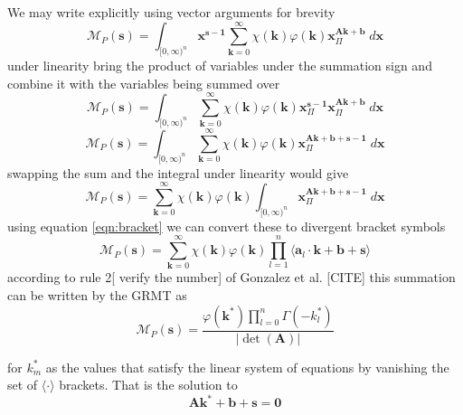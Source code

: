 \documentclass{article}
\begin{document}
We may write explicitly using vector arguments for brevity
\begin{equation}
\mathcal{M}_P(\mathbf{s}) = \int_{[0,\infty)^{n}} \mathbf{x}^{\mathbf{s-1}} \sum_{\mathbf{k}=0}^\infty  \chi(\mathbf{k})\varphi(\mathbf{k}) \mathbf{x}^{\mathbf{A}\mathbf{k}+\mathbf{b}}_\Pi \; d \mathbf{x}
\end{equation}
under linearity bring the product of variables under the summation sign and combine it with the variables being summed over
\begin{equation}
\mathcal{M}_P(\mathbf{s}) = \int_{[0,\infty)^{n}} \sum_{\mathbf{k}=0}^\infty  \chi(\mathbf{k})\varphi(\mathbf{k}) \mathbf{x}^{\mathbf{s-1}}_\Pi \mathbf{x}^{\mathbf{A}\mathbf{k}+\mathbf{b}}_\Pi \; d \mathbf{x}
\end{equation}
\begin{equation}
\mathcal{M}_P(\mathbf{s}) = \int_{[0,\infty)^{n}} \sum_{\mathbf{k}=0}^\infty  \chi(\mathbf{k})\varphi(\mathbf{k})\mathbf{x}^{\mathbf{A}\mathbf{k}+\mathbf{b}+\mathbf{s-1}}_\Pi \; d \mathbf{x}
\end{equation}
swapping the sum and the integral under linearity would give
\begin{equation}
\mathcal{M}_P(\mathbf{s}) = \sum_{\mathbf{k}=0}^\infty  \chi(\mathbf{k})\varphi(\mathbf{k})\int_{[0,\infty)^{n}} \mathbf{x}^{\mathbf{A}\mathbf{k}+\mathbf{b}+\mathbf{s-1}}_\Pi \; d \mathbf{x}
\end{equation}
using equation \ref{eqn:bracket} we can convert these to divergent bracket symbols
\begin{equation}
\mathcal{M}_P(\mathbf{s}) = \sum_{\mathbf{k}=0}^\infty  \chi(\mathbf{k})\varphi(\mathbf{k}) \prod_{l=1}^n \langle \mathbf{a}_l \cdot \mathbf{k} + \mathbf{b} + \mathbf{s} \rangle
\end{equation}
according to rule 2[{\color{red} verify the number}] of Gonzalez et al. [CITE] this summation can be written by the GRMT as 
\begin{equation}
\mathcal{M}_P(\mathbf{s}) = \frac{\varphi(\mathbf{k}^*) \prod_{l=0}^n \Gamma(-k_l^*)}{|\det(\mathbf{A})|}
\end{equation}

for $k^*_m$ as the values that satisfy the linear system of equations by vanishing the set of $\langle \cdot \rangle$ brackets. That is the solution to \begin{equation}
\mathbf{A}\mathbf{k}^*+\mathbf{b}+\mathbf{s} = \mathbf{0}
\end{equation} 
\end{document}
